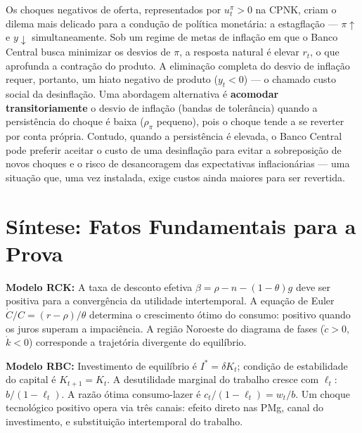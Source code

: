 \documentclass[12pt, a4paper]{article}
\begin{document}
Os choques negativos de oferta, representados por $u_t^\pi > 0$ na CPNK, criam o dilema mais delicado para a condução de política monetária: a estagflação — $\pi\uparrow$ e $y\downarrow$ simultaneamente. Sob um regime de metas de inflação em que o Banco Central busca minimizar os desvios de $\pi$, a resposta natural é elevar $r_t$, o que aprofunda a contração do produto. A eliminação completa do desvio de inflação requer, portanto, um hiato negativo de produto ($y_t < 0$) — o chamado custo social da desinflação. Uma abordagem alternativa é \textbf{acomodar transitoriamente} o desvio de inflação (bandas de tolerância) quando a persistência do choque é baixa ($\rho_\pi$ pequeno), pois o choque tende a se reverter por conta própria. Contudo, quando a persistência é elevada, o Banco Central pode preferir aceitar o custo de uma desinflação para evitar a sobreposição de novos choques e o risco de desancoragem das expectativas inflacionárias — uma situação que, uma vez instalada, exige custos ainda maiores para ser revertida.

\section{Síntese: Fatos Fundamentais para a Prova}

\begin{fatorbox}[title={Lista I --- Fatos-Chave RCK e RBC}]
\textbf{Modelo RCK:}
A taxa de desconto efetiva $\beta = \rho - n - (1-\theta)g$ deve ser positiva para a convergência da utilidade intertemporal. A equação de Euler $\dot{C}/C = (r-\rho)/\theta$ determina o crescimento ótimo do consumo: positivo quando os juros superam a impaciência. A região Noroeste do diagrama de fases ($\dot{c}>0$, $\dot{k}<0$) corresponde a trajetória divergente do equilíbrio.

\textbf{Modelo RBC:}
Investimento de equilíbrio é $I^* = \delta K_t$; condição de estabilidade do capital é $K_{t+1} = K_t$. A desutilidade marginal do trabalho cresce com $\ell_t$: $b/(1-\ell_t)$. A razão ótima consumo-lazer é $c_t/(1-\ell_t) = w_t/b$. Um choque tecnológico positivo opera via três canais: efeito direto nas PMg, canal do investimento, e substituição intertemporal do trabalho.
\end{fatorbox}
\end{document}
